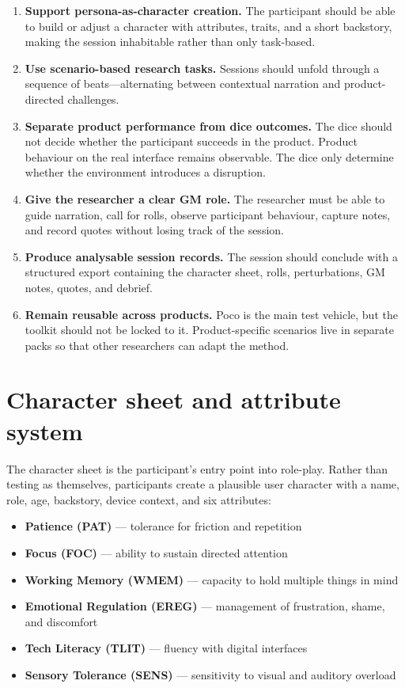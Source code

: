\documentclass[12pt,a4paper]{report}
\begin{document}
\begin{enumerate}
  \item \textbf{Support persona-as-character creation.}
        The participant should be able to build or adjust a character with attributes,
        traits, and a short backstory, making the session inhabitable rather than only
        task-based.
  \item \textbf{Use scenario-based research tasks.}
        Sessions should unfold through a sequence of beats---alternating between
        contextual narration and product-directed challenges.
  \item \textbf{Separate product performance from dice outcomes.}
        The dice should not decide whether the participant succeeds in the product.
        Product behaviour on the real interface remains observable.
        The dice only determine whether the environment introduces a disruption.
  \item \textbf{Give the researcher a clear GM role.}
        The researcher must be able to guide narration, call for rolls, observe
        participant behaviour, capture notes, and record quotes without losing track of
        the session.
  \item \textbf{Produce analysable session records.}
        The session should conclude with a structured export containing the character
        sheet, rolls, perturbations, GM notes, quotes, and debrief.
  \item \textbf{Remain reusable across products.}
        Poco is the main test vehicle, but the toolkit should not be locked to it.
        Product-specific scenarios live in separate packs so that other researchers can
        adapt the method.
\end{enumerate}

\section{Character sheet and attribute system}

The character sheet is the participant's entry point into role-play.
Rather than testing as themselves, participants create a plausible user character with a
name, role, age, backstory, device context, and six attributes:

\begin{itemize}
  \item \textbf{Patience (PAT)} --- tolerance for friction and repetition
  \item \textbf{Focus (FOC)} --- ability to sustain directed attention
  \item \textbf{Working Memory (WMEM)} --- capacity to hold multiple things in mind
  \item \textbf{Emotional Regulation (EREG)} --- management of frustration, shame, and
        discomfort
  \item \textbf{Tech Literacy (TLIT)} --- fluency with digital interfaces
  \item \textbf{Sensory Tolerance (SENS)} --- sensitivity to visual and auditory overload
\end{itemize}
\end{document}
